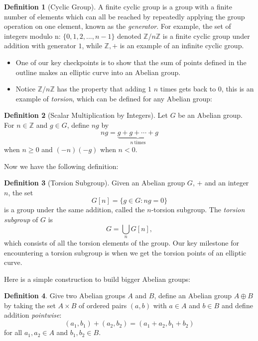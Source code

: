 \documentclass{article}
\theoremstyle{definition}
\newtheorem{definition}{Definition}[section]
\theoremstyle{definition}
\theoremstyle{definition}
\newcommand{\Z}{\mathbb{Z}}
\begin{document}
\begin{definition}[Cyclic Group]
    A finite cyclic group is a group with a finite number of elements which can all be reached by repeatedly applying the group operation on one element, known as the \emph{generator}. For example, the set of integers modulo n: $\{0,1,2,...,n-1\}$ denoted $\mathbb{Z}/n\mathbb{Z}$ is a finite cyclic group under addition with generator $1$, while $\Z,+$ is an example of an infinite cyclic group.
\end{definition}

\begin{itemize}
    \item One of our key checkpoints is to show that the sum of points defined in the outline makes an elliptic curve into an Abelian group.
     \item Notice $\Z/n\Z$ has the property that adding $1$ $n$ times gets back to $0$, this is an example of \emph{torsion}, which can be defined for any Abelian group: 
\end{itemize}

\begin{definition} [Scalar Multiplication by Integers]
     Let $G$ be an Abelian group. For $n \in\Z$ and $g\in G$, define %
     $ng$ by
     $$ng = \underbrace{g + g + \cdots + g}_{n\ \text{times}}$$
     when $n\geq0$ and $(-n)(-g)$ when $n<0$.
\end{definition}%

Now we have the following definition:
\begin{definition}[Torsion Subgroup] Given an Abelian group $G$, $+$ and an integer $n$, the set 
$$G[n]=\{g\in G:ng=0\}$$
is a group under the same addition, called the $n$-torsion subgroup. The \emph{torsion subgroup} of $G$ is 
$$G=\bigcup_n G[n],$$
which consists of all the torsion elements of the group.
\newline\newline
Our key milestone for encountering a torsion subgroup is when we get the torsion points of an elliptic curve.
    
\end{definition}

Here is a simple construction to build bigger Abelian groups:

\begin{definition}
    Give two Abelian groups $A$ and $B$, define an Abelian group $A\oplus B$ by taking the set $A\times B$ of ordered pairs $(a,b)$ with $a\in A$ and $b\in B$ and define addition \emph{pointwise}:
    $$(a_1,b_1)+(a_2,b_2)=(a_1+a_2,b_1+b_2)$$
    for all $a_1,a_2\in A$ and $b_1,b_2\in B$.
\end{definition}
\end{document}

